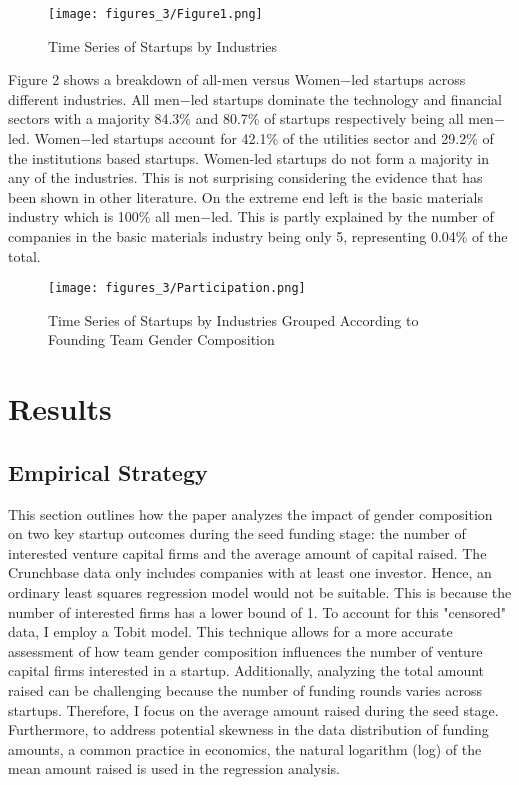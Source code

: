 \begin{figure}
 \captionsetup{justification=raggedright,singlelinecheck=false}
\caption{Time Series of Startups by Industries }
\texttt{[image: figures\_3/Figure1.png]} 
\end{figure}


\hspace *{0mm} Figure 2 shows a breakdown of all-men versus Women$-$led startups across different industries. All men$-$led startups dominate the technology and financial sectors with a majority 84.3$\%$ and 80.7$\%$ of startups respectively being all men$-$led. Women$-$led startups account for 42.1$\%$ of the utilities sector and 29.2$\%$ of the institutions based startups. Women-led startups do not form a majority in any of the industries. This is not surprising considering the evidence that has been shown in other literature. On the extreme end left is the basic materials industry which is 100\% all men$-$led. This is partly explained by the number of companies in the basic materials industry being only 5, representing 0.04\% of the total. 

\begin{figure}
 \captionsetup{justification=raggedright,singlelinecheck=false}
\caption{Time Series of Startups by Industries Grouped According to Founding Team Gender Composition }
\texttt{[image: figures\_3/Participation.png]} 
\end{figure}

\section{Results} \label{sec:Empirical Strategy}

\subsection{Empirical Strategy}

This section outlines how the paper analyzes the impact of gender composition on two key startup outcomes during the seed funding stage: the number of interested venture capital firms and the average amount of capital raised. The Crunchbase data only includes companies with at least one investor. Hence, an ordinary least squares regression model would not be suitable. This is because the number of interested firms has a lower bound of 1.  To account for this "censored" data, I employ a Tobit model. This technique allows for a more accurate assessment of how team gender composition influences the number of venture capital firms interested in a startup. Additionally, analyzing the total amount raised can be challenging because the number of funding rounds varies across startups. Therefore, I focus on the average amount raised during the seed stage.  Furthermore, to address potential skewness in the data distribution of funding amounts, a common practice in economics, the natural logarithm (log) of the mean amount raised is used in the regression analysis.

